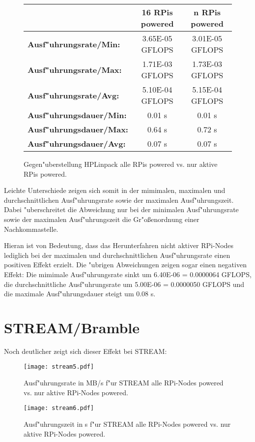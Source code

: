 \begin{figure}[h!]
  \centering
  \begin{tabular}{|l|c|c|}
    \hline 
     & \textbf{16 RPis powered} & \textbf{n RPis powered}\\ 
    \hline 
    \textbf{Ausf"uhrungsrate/Min:} & 3.65E-05 GFLOPS & 3.01E-05 GFLOPS \\
    \hline 
    \textbf{Ausf"uhrungsrate/Max:} & 1.71E-03 GFLOPS & 1.73E-03 GFLOPS \\
    \hline 
    \textbf{Ausf"uhrungsrate/Avg:} & 5.10E-04 GFLOPS & 5.15E-04 GFLOPS \\
    \hline 
    \textbf{Ausf"uhrungsdauer/Min:} & 0.01 s & 0.01 s \\
    \hline 
    \textbf{Ausf"uhrungsdauer/Max:} & 0.64 s & 0.72 s \\
	\hline 
    \textbf{Ausf"uhrungsdauer/Avg:} & 0.07 s & 0.07 s\\
    \hline
  \end{tabular}
  \caption{Gegen"uberstellung HPLinpack alle RPis powered vs. nur aktive RPis powered.}\label{fig:hpl-vgl}
\end{figure}
\noindent
Leichte Unterschiede zeigen sich somit in der mimimalen, maximalen und durchschnittlichen Ausf"uhrungsrate sowie der maximalen Ausf"uhrungszeit. Dabei "uberschreitet die Abweichung nur bei der minimalen Ausf"uhrungsrate sowie der maximalen Ausf"uhrungszeit die Gr"o\ss enordnung einer Nachkommastelle. 

Hieran ist von Bedeutung, dass das Herunterfahren nicht aktiver RPi-Nodes lediglich bei der maximalen und durchschnittlichen Ausf"uhrungsrate einen positiven Effekt erzielt. Die "ubrigen Abweichungen zeigen sogar einen negativen Effekt: Die mimimale Ausf"uhrungsrate sinkt um 6.40E-06 = 0.0000064 GFLOPS, die durchschnittliche Ausf"uhrungsrate um 5.00E-06 = 0.0000050 GFLOPS und die maximale Ausf"uhrungsdauer steigt um 0.08 s. 

\section{STREAM/Bramble}\label{Interpretation-Stream}

Noch deutlicher zeigt sich dieser Effekt bei STREAM: 

\begin{figure}[h!]
  \centering
  \texttt{[image: stream5.pdf]}\\ 
  \caption{Ausf"uhrungsrate in MB/s f"ur STREAM alle RPi-Nodes powered vs. nur aktive RPi-Nodes powered.}\label{fig:stream5}
\end{figure}
\begin{figure}[htb]
  \centering
  \texttt{[image: stream6.pdf]}\\ 
  \caption{Ausf"uhrungszeit in s f"ur STREAM alle RPi-Nodes powered vs. nur aktive RPi-Nodes powered.}\label{fig:stream6}
\end{figure}

